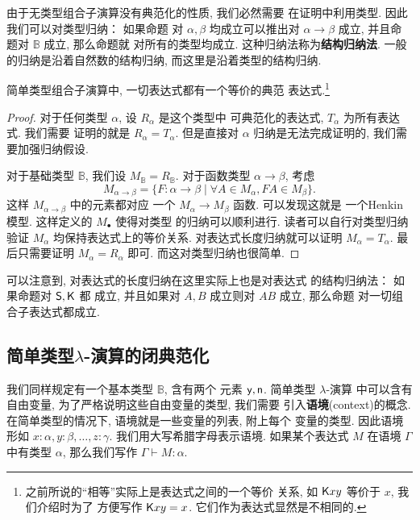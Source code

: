 由于无类型组合子演算没有典范化的性质, 我们必然需要
在证明中利用类型. 因此我们可以对类型归纳： 如果命题
对 \(\alpha,\beta\) 均成立可以推出对 \(\alpha\to\beta\)
成立, 并且命题对 \(\mathbb B\) 成立, 那么命题就
对所有的类型均成立. 这种归纳法称为\textbf{结构归纳法}.
一般的归纳是沿着自然数的结构归纳, 而这里是沿着类型的结构归纳.

\begin{theorem}
简单类型组合子演算中, 一切表达式都有一个等价的典范
表达式.\footnote{之前所说的“相等”实际上是表达式之间的一个等价
关系, 如 \(\textnormal{\textsf{K}}xy\) 等价于 \(x\), 我们介绍时为了
方便写作 \(\textnormal{\textsf{K}}xy = x\). 它们作为表达式显然是不相同的.}
\end{theorem}
\begin{proof}
对于任何类型 \(\alpha\), 设 \(R_\alpha\) 是这个类型中
可典范化的表达式, \(T_\alpha\) 为所有表达式. 我们需要
证明的就是 \(R_\alpha = T_\alpha\). 但是直接对 \(\alpha\)
归纳是无法完成证明的, 我们需要加强归纳假设.

对于基础类型 \(\mathbb B\), 我们设 \(M_{\mathbb B} = R_{\mathbb B}\).
对于函数类型 \(\alpha \to \beta\), 考虑
\[M_{\alpha \to \beta} = \{F : \alpha \to \beta \mid
\forall A \in M_\alpha, FA \in M_\beta\}.\]
这样 \(M_{\alpha \to \beta}\) 中的元素都对应
一个 \(M_\alpha \to M_\beta\) 函数. 可以发现这就是
一个Henkin模型. 这样定义的 \(M_\bullet\) 使得对类型
的归纳可以顺利进行. 读者可以自行对类型归纳验证 \(M_\alpha\)
均保持表达式上的等价关系. 对表达式长度归纳就可以证明
\(M_\alpha = T_\alpha\). 最后只需要证明 \(M_\alpha = R_\alpha\)
即可. 而这对类型归纳也很简单.
\end{proof}

可以注意到, 对表达式的长度归纳在这里实际上也是对表达式
的结构归纳法： 如果命题对 \(\textnormal{\textsf{S}}, \textnormal{\textsf{K}}\) 都
成立, 并且如果对 \(A,B\) 成立则对 \(AB\) 成立, 那么命题
对一切组合子表达式都成立.

\subsection{简单类型\texorpdfstring{\(\lambda\)}{Lambda}-演算的闭典范化}
\label{beginning:stlc:canonicity}
我们同样规定有一个基本类型 \(\mathbb B\), 含有两个
元素 \(\textnormal{\textsf{y}}, \textnormal{\textsf{n}}\). 简单类型 \(\lambda\)-演算
中可以含有自由变量, 为了严格说明这些自由变量的类型, 我们需要
引入\textbf{语境}(context)的概念.
在简单类型的情况下, 语境就是一些变量的列表, 附上每个
变量的类型. 因此语境形如 \(x{:}\alpha, y{:}\beta, \dots, z{:}\gamma\).
我们用大写希腊字母表示语境. 如果某个表达式 \(M\)
在语境 \(\Gamma\) 中有类型 \(\alpha\),
那么我们写作 \(\Gamma \vdash M : \alpha\).

